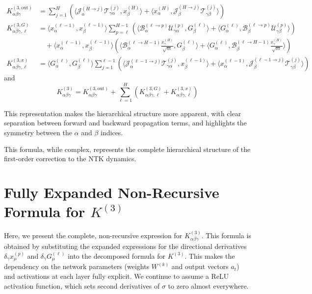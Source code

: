 \documentclass[11pt,a4paper]{article}
\theoremstyle{definition}
\begin{document}
\begin{align}
K^{(3, \text{out})}_{\alpha\beta\gamma} &= \sum_{j=1}^{H} \left( \langle \mathcal{J}^{(H \to j)}_{\alpha} \mathcal{T}^{(j)}_{\gamma\alpha}, x^{(H)}_\beta \rangle + \langle x^{(H)}_\alpha, \mathcal{J}^{(H \to j)}_{\beta} \mathcal{T}^{(j)}_{\gamma\beta} \rangle \right) \\
K^{(3, G)}_{\alpha\beta\gamma, \ell} &= \langle x^{(\ell-1)}_\alpha, x^{(\ell-1)}_\beta \rangle \sum_{p=\ell}^{H-1} \left( \langle \mathcal{B}^{(\ell \to p)}_{\alpha} \mathcal{U}^{(p)}_{\gamma\alpha}, G^{(\ell)}_\beta \rangle + \langle G^{(\ell)}_\alpha, \mathcal{B}^{(\ell \to p)}_{\beta} \mathcal{U}^{(p)}_{\gamma\beta} \rangle \right) \nonumber \\
&\quad + \langle x^{(\ell-1)}_\alpha, x^{(\ell-1)}_\beta \rangle \left( \langle \mathcal{B}^{(\ell \to H-1)}_{\alpha} \frac{x^{(H)}_\gamma}{\sqrt{m}}, G^{(\ell)}_\beta \rangle + \langle G^{(\ell)}_\alpha, \mathcal{B}^{(\ell \to H-1)}_{\beta} \frac{x^{(H)}_\gamma}{\sqrt{m}} \rangle \right) \\
K^{(3, x)}_{\alpha\beta\gamma, \ell} &= \langle G^{(\ell)}_\alpha, G^{(\ell)}_\beta \rangle \sum_{j=1}^{\ell-1} \left( \langle \mathcal{J}^{(\ell-1 \to j)}_{\alpha} \mathcal{T}^{(j)}_{\gamma\alpha}, x^{(\ell-1)}_\beta \rangle + \langle x^{(\ell-1)}_\alpha, \mathcal{J}^{(\ell-1 \to j)}_{\beta} \mathcal{T}^{(j)}_{\gamma\beta} \rangle \right)
\end{align}
and 
\begin{equation}
    K^{(3)}_{\alpha\beta\gamma} = K^{(3, \text{out})}_{\alpha\beta\gamma} + \sum_{\ell=1}^H \left( K^{(3, G)}_{\alpha\beta\gamma, \ell} + K^{(3, x)}_{\alpha\beta\gamma, \ell} \right)
    \end{equation}

This representation makes the hierarchical structure more apparent, with clear separation between forward and backward propagation terms, and highlights the symmetry between the $\alpha$ and $\beta$ indices.


This formula, while complex, represents the complete hierarchical structure of the first-order correction to the NTK dynamics.


\section{Fully Expanded Non-Recursive Formula for $K^{(3)}$}

Here, we present the complete, non-recursive expression for $K^{(3)}_{\alpha\beta\gamma}$. This formula is obtained by substituting the expanded expressions for the directional derivatives $\delta_\gamma x^{(p)}_\mu$ and $\delta_\gamma G^{(\ell)}_\mu$ into the decomposed formula for $K^{(3)}$. This makes the dependency on the network parameters (weights $W^{(k)}$ and output vectors $a_t$) and activations at each layer fully explicit. We continue to assume a ReLU activation function, which sets second derivatives of $\sigma$ to zero almost everywhere.
\end{document}
